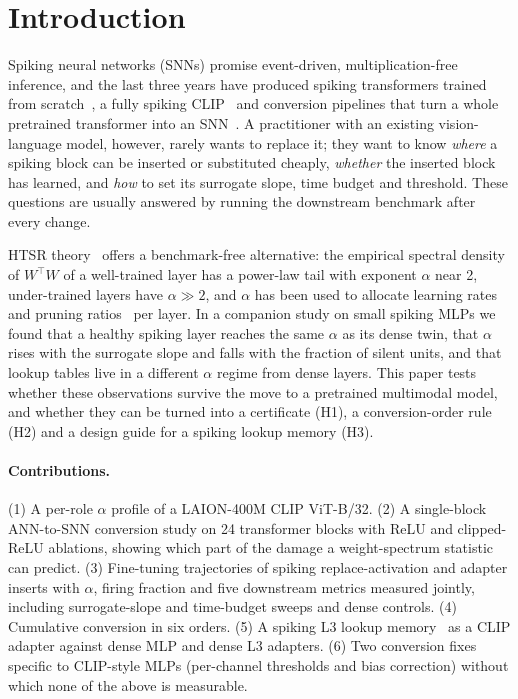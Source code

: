 \section{Introduction}
Spiking neural networks (SNNs) promise event-driven, multiplication-free inference, and the last three years have produced spiking transformers trained from scratch~\cite{zhou2023spikformer,yao2023spikedriven}, a fully spiking CLIP~\cite{li2023spikeclip} and conversion pipelines that turn a whole pretrained transformer into an SNN~\cite{you2024spikeziptf,jiang2024sta}. A practitioner with an existing vision-language model, however, rarely wants to replace it; they want to know \emph{where} a spiking block can be inserted or substituted cheaply, \emph{whether} the inserted block has learned, and \emph{how} to set its surrogate slope, time budget and threshold. These questions are usually answered by running the downstream benchmark after every change.

HTSR theory~\cite{martin2021htsr,martin2021predicting} offers a benchmark-free alternative: the empirical spectral density of $W^\top W$ of a well-trained layer has a power-law tail with exponent $\alpha$ near 2, under-trained layers have $\alpha \gg 2$, and $\alpha$ has been used to allocate learning rates~\cite{zhou2023tempbalance} and pruning ratios~\cite{lu2024alphapruning} per layer. In a companion study on small spiking MLPs we found that a healthy spiking layer reaches the same $\alpha$ as its dense twin, that $\alpha$ rises with the surrogate slope and falls with the fraction of silent units, and that lookup tables live in a different $\alpha$ regime from dense layers. This paper tests whether these observations survive the move to a pretrained multimodal model, and whether they can be turned into a certificate (H1), a conversion-order rule (H2) and a design guide for a spiking lookup memory (H3).

\paragraph{Contributions.}
(1) A per-role $\alpha$ profile of a LAION-400M CLIP ViT-B/32. (2) A single-block ANN-to-SNN conversion study on 24 transformer blocks with ReLU and clipped-ReLU ablations, showing which part of the damage a weight-spectrum statistic can predict. (3) Fine-tuning trajectories of spiking replace-activation and adapter inserts with $\alpha$, firing fraction and five downstream metrics measured jointly, including surrogate-slope and time-budget sweeps and dense controls. (4) Cumulative conversion in six orders. (5) A spiking L3 lookup memory~\cite{tseng2026l3} as a CLIP adapter against dense MLP and dense L3 adapters. (6) Two conversion fixes specific to CLIP-style MLPs (per-channel thresholds and bias correction) without which none of the above is measurable.
